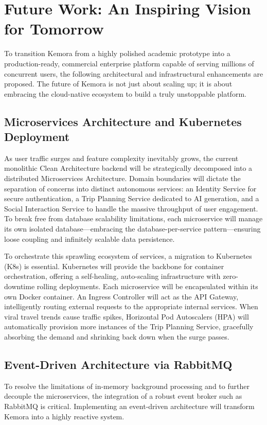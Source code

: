 \section{Future Work: An Inspiring Vision for Tomorrow}
To transition Kemora from a highly polished academic prototype into a production-ready, commercial enterprise platform capable of serving millions of concurrent users, the following architectural and infrastructural enhancements are proposed. The future of Kemora is not just about scaling up; it is about embracing the cloud-native ecosystem to build a truly unstoppable platform.

\subsection{Microservices Architecture and Kubernetes Deployment}
As user traffic surges and feature complexity inevitably grows, the current monolithic Clean Architecture backend will be strategically decomposed into a distributed Microservices Architecture. Domain boundaries will dictate the separation of concerns into distinct autonomous services: an Identity Service for secure authentication, a Trip Planning Service dedicated to AI generation, and a Social Interaction Service to handle the massive throughput of user engagement. To break free from database scalability limitations, each microservice will manage its own isolated database---embracing the database-per-service pattern---ensuring loose coupling and infinitely scalable data persistence.

To orchestrate this sprawling ecosystem of services, a migration to Kubernetes (K8s) is essential. Kubernetes will provide the backbone for container orchestration, offering a self-healing, auto-scaling infrastructure with zero-downtime rolling deployments. Each microservice will be encapsulated within its own Docker container. An Ingress Controller will act as the API Gateway, intelligently routing external requests to the appropriate internal services. When viral travel trends cause traffic spikes, Horizontal Pod Autoscalers (HPA) will automatically provision more instances of the Trip Planning Service, gracefully absorbing the demand and shrinking back down when the surge passes.

\subsection{Event-Driven Architecture via RabbitMQ}
To resolve the limitations of in-memory background processing and to further decouple the microservices, the integration of a robust event broker such as RabbitMQ is critical. Implementing an event-driven architecture will transform Kemora into a highly reactive system.

